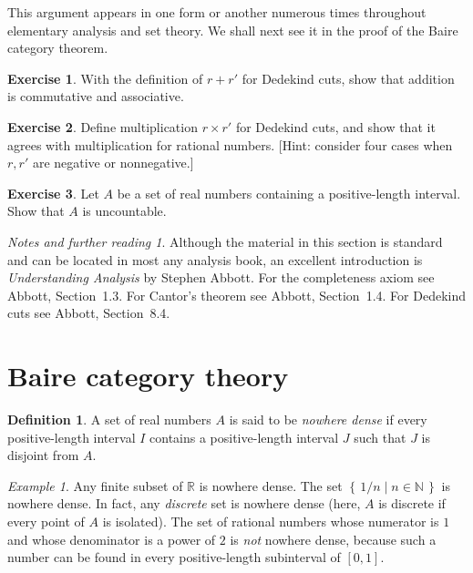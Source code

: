 \documentclass[11pt,oneside]{amsbook}
\newcommand{\set}[1]{\left\{\,#1\,\right\}}
\newcommand{\NN}{\mathbb N}
\newcommand{\RR}{\mathbb R}
\theoremstyle{definition}
\newtheorem{exerc}{Exercise}[section]
\theoremstyle{plain}
\theoremstyle{definition}
\newtheorem{defn}[thm]{Definition}
\theoremstyle{remark}
\newtheorem{example}[thm]{Example}
\newtheorem*{notes}{Notes and further reading}
\begin{document}
This argument appears in one form or another numerous times throughout elementary analysis and set theory. We shall next see it in the proof of the Baire category theorem.

\begin{exerc}
  With the definition of $r+r'$ for Dedekind cuts, show that addition is commutative and associative.
\end{exerc}

\begin{exerc}
  Define multiplication $r\times r'$ for Dedekind cuts, and show that it agrees with multiplication for rational numbers. [Hint: consider four cases when $r,r'$ are negative or nonnegative.]
\end{exerc}

\begin{exerc}
  Let $A$ be a set of real numbers containing a positive-length interval. Show that $A$ is uncountable.
\end{exerc}

\begin{notes}
  Although the material in this section is standard and can be located in most any analysis book, an excellent introduction is \emph{Understanding Analysis} by Stephen Abbott. For the completeness axiom see Abbott, Section~1.3. For Cantor's theorem see Abbott, Section~1.4. For Dedekind cuts see Abbott, Section~8.4.
\end{notes}

\section{Baire category theory}

\begin{defn}
  A set of real numbers $A$ is said to be \emph{nowhere dense} if every positive-length interval $I$ contains a positive-length interval $J$ such that $J$ is disjoint from $A$.
\end{defn}

\begin{example}
  Any finite subset of $\RR$ is nowhere dense. The set $\set{1/n\mid n\in\NN}$ is nowhere dense. In fact, any \emph{discrete} set is nowhere dense (here, $A$ is discrete if every point of $A$ is isolated). The set of rational numbers whose numerator is $1$ and whose denominator is a power of $2$ is \emph{not} nowhere dense, because such a number can be found in every positive-length subinterval of $[0,1]$.
\end{example}
\end{document}
